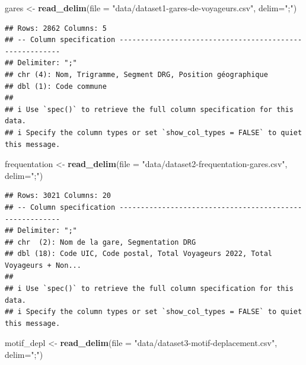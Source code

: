 \documentclass[
]{article}
\newenvironment{Shaded}{\begin{snugshade}}{\end{snugshade}}
\newcommand{\AttributeTok}[1]{\textcolor[rgb]{0.13,0.29,0.53}{#1}}
\newcommand{\FunctionTok}[1]{\textcolor[rgb]{0.13,0.29,0.53}{\textbf{#1}}}
\newcommand{\NormalTok}[1]{#1}
\newcommand{\OtherTok}[1]{\textcolor[rgb]{0.56,0.35,0.01}{#1}}
\newcommand{\StringTok}[1]{\textcolor[rgb]{0.31,0.60,0.02}{#1}}
\begin{document}
\begin{Shaded}
\begin{Highlighting}[]
\NormalTok{gares }\OtherTok{\textless{}{-}} \FunctionTok{read\_delim}\NormalTok{(}\AttributeTok{file =} \StringTok{"data/dataset1{-}gares{-}de{-}voyageurs.csv"}\NormalTok{, }\AttributeTok{delim=}\StringTok{";"}\NormalTok{)}
\end{Highlighting}
\end{Shaded}

\begin{verbatim}
## Rows: 2862 Columns: 5
## -- Column specification --------------------------------------------------------
## Delimiter: ";"
## chr (4): Nom, Trigramme, Segment DRG, Position géographique
## dbl (1): Code commune
## 
## i Use `spec()` to retrieve the full column specification for this data.
## i Specify the column types or set `show_col_types = FALSE` to quiet this message.
\end{verbatim}

\begin{Shaded}
\begin{Highlighting}[]
\NormalTok{frequentation }\OtherTok{\textless{}{-}} \FunctionTok{read\_delim}\NormalTok{(}\AttributeTok{file =} \StringTok{"data/dataset2{-}frequentation{-}gares.csv"}\NormalTok{, }\AttributeTok{delim=}\StringTok{";"}\NormalTok{)}
\end{Highlighting}
\end{Shaded}

\begin{verbatim}
## Rows: 3021 Columns: 20
## -- Column specification --------------------------------------------------------
## Delimiter: ";"
## chr  (2): Nom de la gare, Segmentation DRG
## dbl (18): Code UIC, Code postal, Total Voyageurs 2022, Total Voyageurs + Non...
## 
## i Use `spec()` to retrieve the full column specification for this data.
## i Specify the column types or set `show_col_types = FALSE` to quiet this message.
\end{verbatim}

\begin{Shaded}
\begin{Highlighting}[]
\NormalTok{motif\_depl }\OtherTok{\textless{}{-}} \FunctionTok{read\_delim}\NormalTok{(}\AttributeTok{file =} \StringTok{"data/dataset3{-}motif{-}deplacement.csv"}\NormalTok{, }\AttributeTok{delim=}\StringTok{";"}\NormalTok{)}
\end{Highlighting}
\end{Shaded}
\end{document}
